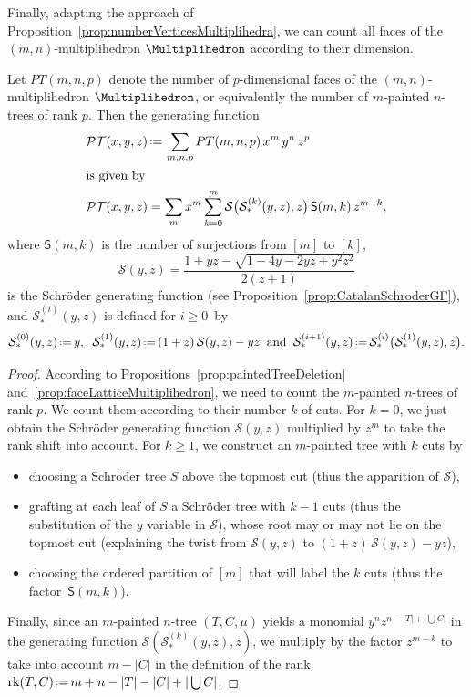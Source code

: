 \documentclass[AHL,Unicode,longabstracts,published]{cedram}
\DeclareMathOperator{\rank}{rk}
\newcommand{\eqdef}{\mbox{\,\raisebox{0.2ex}{\scriptsize\ensuremath{\mathrm:}}\ensuremath{=}\,}}
\newcommand{\surjections}[2]{\mathsf{S}(#1,#2)}
\newcommand{\PTGF}{\mathcal{PT}}
\newcommand{\SGF}{\mathcal{S}}
\newcommand{\tSGF}{\mathcal{S}_\ast}
\begin{document}
Finally, adapting the approach of Proposition~\ref{prop:numberVerticesMultiplihedra}, we can count all faces of the $(m,n)$-multipli\-hedron $\Multiplihedron$ according to their dimension.

\begin{prop}\label{prop:numberFacesMultiplihedra}
Let $PT(m,n,p)$ denote the number of $p$-dimensional faces of the $(m,n)$-multipli\-hedron $\Multiplihedron$, or equivalently the number of $m$-painted  $n$-trees of rank $p$. Then the generating function
\begin{align*}
\PTGF(x,y,z) &\eqdef \sum_{m,n,p} PT(m,n,p) \, x^m \, y^n \, z^p
\\
\intertext{is given by}
\PTGF(x,y,z) &= \sum_m x^m \sum_{k = 0}^m \SGF \big(\tSGF^{(k)}(y,z), z \big) \, \surjections{m}{k} \, z^{m-k},
\end{align*}
where $\surjections{m}{k}$ is the number of surjections from $[m]$ to $[k]$,
\[
\SGF(y,z) = \frac{1+yz-\sqrt{1-4y-2yz+y^2z^2}}{2(z+1)}
\]
is the Schr\"oder generating function (see Proposition~\ref{prop:CatalanSchroderGF}), and $\tSGF^{(i)}(y,z)$ is defined for $i \ge 0$~by
\[
\tSGF^{(0)}(y,z) \eqdef y,
\;\;
\tSGF^{(1)}(y,z) \eqdef (1+z) \, \SGF(y,z) - yz
\;\;\text{and}\;\;
\tSGF^{(i+1)}(y,z) \eqdef \tSGF^{(i)} \big(\tSGF^{(1)}(y,z), z \big).
\]
\end{prop}

\begin{proof}
According to Propositions~\ref{prop:paintedTreeDeletion} and~\ref{prop:faceLatticeMultiplihedron}, we need to count the $m$-painted $n$-trees of rank $p$. We count them according to their number $k$ of cuts. For $k = 0$, we just obtain the Schr\"oder generating function $\SGF(y,z)$ multiplied by $z^m$ to take the rank shift into account. For $k \ge 1$, we construct an $m$-painted tree with $k$ cuts by
\begin{itemize}
\item choosing a Schr\"oder tree $S$ above the topmost cut (thus the apparition of $\SGF$),
\item grafting at each leaf of $S$ a Schr\"oder tree with $k-1$ cuts (thus the substitution of the $y$ variable in $\SGF$), whose root may or may not lie on the topmost cut (explaining the twist from $\SGF(y,z)$ to $(1+z) \, \SGF(y,z) - yz$),
\item choosing the ordered partition of $[m]$ that will label the $k$ cuts (thus the factor~$\surjections{m}{k}$).
\end{itemize}
Finally, since an $m$-painted $n$-tree $(T,C,\mu)$ yields a monomial $y^n z^{n - |T| + |\bigcup C|}$ in the generating function $\SGF (\tSGF^{(k)}(y,z), z)$, we multiply by the factor $z^{m-k}$ to take into account $m - |C|$ in the definition of the rank $\rank(T,C) \eqdef m + n - |T| - |C| + |\bigcup C|$.
\end{proof}
\end{document}
